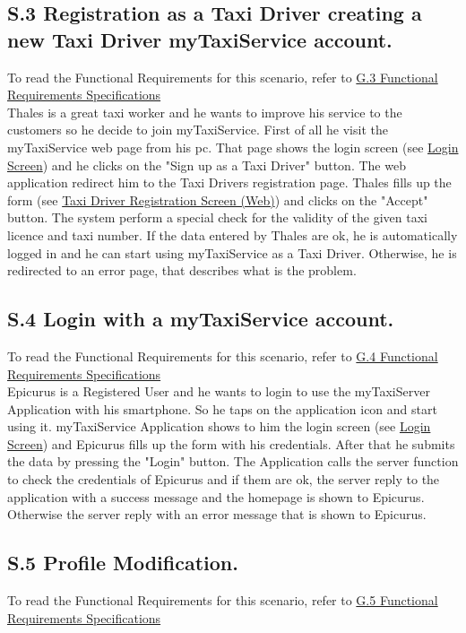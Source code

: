 		\subsection{S.3 Registration as a Taxi Driver creating a new Taxi Driver myTaxiService account.}\label{sec:TaxiDriverRegistrationScenario}
		To read the Functional Requirements for this scenario, refer to \hyperref[sec:frs3]{G.3 Functional Requirements Specifications}\\

		Thales is a great taxi worker and he wants to improve his service to the customers so he decide to join myTaxiService.
		First of all he visit the myTaxiService web page from his pc. That page shows the login screen (see \hyperref[login_m]{Login Screen}) and he clicks on the "Sign up as a Taxi Driver" button. The web application redirect him to the Taxi Drivers registration page. Thales fills up the form (see \hyperref[tregistration_w]{Taxi Driver Registration Screen (Web)}) and clicks on the "Accept" button. The system perform a special check for the validity of the given taxi licence and taxi number. If the data entered by Thales are ok, he is automatically logged in and he can start using myTaxiService as a Taxi Driver. Otherwise, he is redirected to an error page, that describes what is the problem.

		\subsection{S.4 Login with a myTaxiService account.}\label{sec:RegisteredUserLoginScenario}
		To read the Functional Requirements for this scenario, refer to \hyperref[sec:frs4]{G.4 Functional Requirements Specifications}\\

		Epicurus is a Registered User and he wants to login to use the myTaxiServer Application with his smartphone. So he taps on the application icon and start using it. myTaxiService Application shows to him the login screen (see \hyperref[login_m]{Login Screen}) and Epicurus fills up the form with his credentials. After that he submits the data by pressing the "Login" button. The Application calls the server function to check the credentials of Epicurus and if them are ok, the server reply to the application with a success message and the homepage is shown to Epicurus. Otherwise the server reply with an error message that is shown to Epicurus.

		\subsection{S.5 Profile Modification.}\label{sec:RegisteredUserProfileModificationScenario}
		To read the Functional Requirements for this scenario, refer to \hyperref[sec:frs5]{G.5 Functional Requirements Specifications}\\

